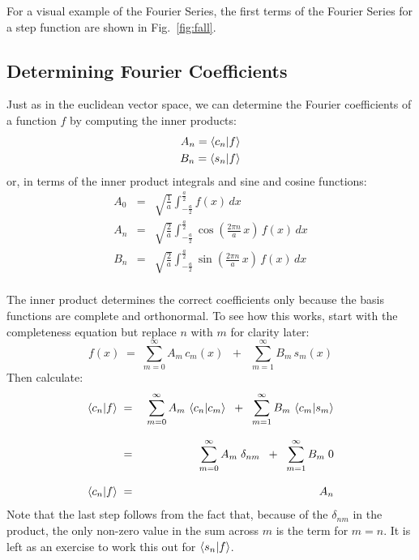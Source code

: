 \documentclass[12pt]{book}
\begin{document}
For a visual example of the Fourier Series, the first terms of the Fourier Series for a step function are shown in Fig.~\ref{fig:fall}.  

\subsection{Determining Fourier Coefficients}
\label{sect:coeff}

Just as in the euclidean vector space, we can determine the Fourier coefficients of a function $f$ by computing the inner products:
\begin{eqnarray*}
A_n = \braket{c_n| f} \\
B_n = \braket{s_n| f}
\end{eqnarray*}
or, in terms of the inner product integrals and sine and cosine functions:
\begin{eqnarray*}
A_0 &=& \sqrt{\frac{1}{a}} \int_{-\frac{a}{2}}^{\frac{a}{2}} f(x) \, dx \\
A_n &=& \sqrt{\frac{2}{a}} \int_{-\frac{a}{2}}^{\frac{a}{2}} 
\cos\left(\frac{2\pi n}{a} \, x \right) \, f(x) \, dx \\
B_n &=& \sqrt{\frac{2}{a}} \int_{-\frac{a}{2}}^{\frac{a}{2}} 
\sin\left(\frac{2\pi n}{a} \, x \right) \, f(x) \, dx \\
\end{eqnarray*}


The inner product determines the correct coefficients only because the basis functions are complete and orthonormal.  To see how this works, start with the completeness equation but replace $n$ with $m$ for clarity later:
\begin{equation*}
f(x) \; = \; \sum_{m=0}^{\infty}  A_m \, c_m(x)  \; \; + \; \; \sum_{m=1}^{\infty} B_m \, s_m(x)
\end{equation*}
Then calculate:
\begin{eqnarray*}
\braket{c_n| f} \; &=& \; \sum_{m=0}^{\infty}  A_m \, \braket{c_n| c_m}  \; \; + \; \; \sum_{m=1}^{\infty} B_m \, \braket{c_m| s_m} \\[8pt]
 &=& \; \sum_{m=0}^{\infty}  A_m \; \delta_{nm}  \; \; + \; \; \sum_{m=1}^{\infty} B_m \; 0 \\[8pt]
\braket{c_n| f} \; &=& A_n \\
\end{eqnarray*}
Note that the last step follows from the fact that, because of the $\delta_{nm}$ in the product, the only non-zero value in the sum across $m$ is the term for $m=n$.  It is left as an exercise to work this out for $\braket{s_n | f}$.
\end{document}
